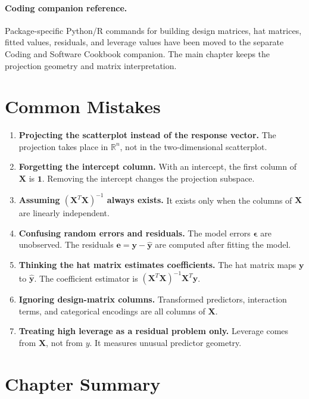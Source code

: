 \paragraph{Coding companion reference.}
Package-specific Python/R commands for building design matrices, hat matrices, fitted values, residuals, and leverage values have been moved to the separate Coding and Software Cookbook companion.  The main chapter keeps the projection geometry and matrix interpretation.

\section{Common Mistakes}

\begin{enumerate}
  \item \textbf{Projecting the scatterplot instead of the response vector.}  The projection takes place in \(\mathbb{R}^n\), not in the two-dimensional scatterplot.
  \item \textbf{Forgetting the intercept column.}  With an intercept, the first column of \(\mathbf{X}\) is \(\mathbf{1}\).  Removing the intercept changes the projection subspace.
  \item \textbf{Assuming \((\mathbf{X}^T\mathbf{X})^{-1}\) always exists.}  It exists only when the columns of \(\mathbf{X}\) are linearly independent.
  \item \textbf{Confusing random errors and residuals.}  The model errors \(\boldsymbol{\epsilon}\) are unobserved.  The residuals \(\mathbf{e}=\mathbf{y}-\widehat{\mathbf{y}}\) are computed after fitting the model.
  \item \textbf{Thinking the hat matrix estimates coefficients.}  The hat matrix maps \(\mathbf{y}\) to \(\widehat{\mathbf{y}}\).  The coefficient estimator is \((\mathbf{X}^T\mathbf{X})^{-1}\mathbf{X}^T\mathbf{y}\).
  \item \textbf{Ignoring design-matrix columns.}  Transformed predictors, interaction terms, and categorical encodings are all columns of \(\mathbf{X}\).
  \item \textbf{Treating high leverage as a residual problem only.}  Leverage comes from \(\mathbf{X}\), not from \(y\).  It measures unusual predictor geometry.
\end{enumerate}

\section{Chapter Summary}

